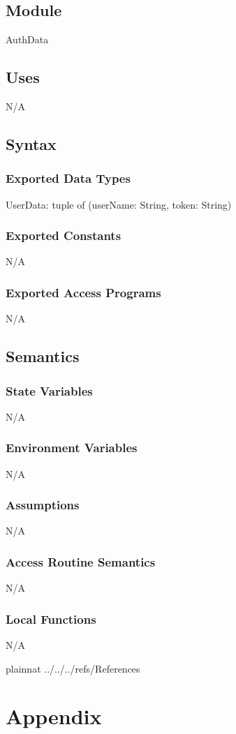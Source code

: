 \documentclass[12pt, titlepage]{article}
\begin{document}
	\subsection{Module}
	AuthData
	
	\subsection{Uses}
	N/A
	
	\subsection{Syntax}
	\subsubsection{Exported Data Types}
	
	UserData: tuple of (userName: String, token: String)
	
	\subsubsection{Exported Constants}
	N/A
	
	\subsubsection{Exported Access Programs}
	N/A
	
	\subsection{Semantics}
	
	\subsubsection{State Variables}
	N/A
	
	\subsubsection{Environment Variables}
	N/A
	
	\subsubsection{Assumptions}
	N/A
	
	\subsubsection{Access Routine Semantics}
	N/A
	
	\subsubsection{Local Functions}
	N/A
	
	\newpage
	
	
	
	 {plainnat}
	 {../../../refs/References}
	
	\newpage
	
	\section{Appendix} \label{Appendix}
	
	
\end{document}
